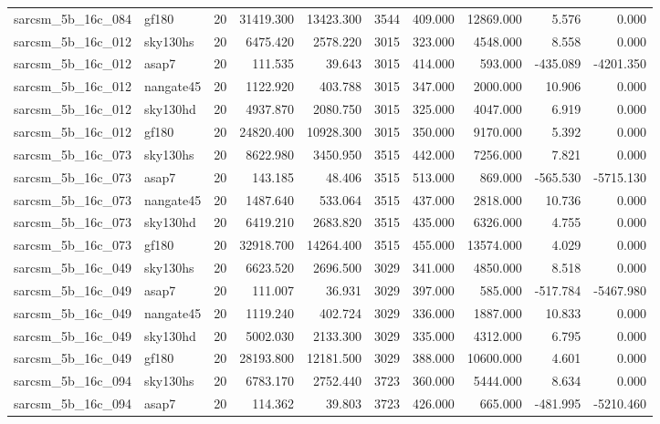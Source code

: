 \documentclass{article}
\begin{document}
\begin{longtable}{llrrrrrrrr}
sarcsm\_5b\_16c\_084 & gf180 & 20 & 31419.300 & 13423.300 & 3544 & 409.000 & 12869.000 & 5.576 & 0.000 \\
sarcsm\_5b\_16c\_012 & sky130hs & 20 & 6475.420 & 2578.220 & 3015 & 323.000 & 4548.000 & 8.558 & 0.000 \\
sarcsm\_5b\_16c\_012 & asap7 & 20 & 111.535 & 39.643 & 3015 & 414.000 & 593.000 & -435.089 & -4201.350 \\
sarcsm\_5b\_16c\_012 & nangate45 & 20 & 1122.920 & 403.788 & 3015 & 347.000 & 2000.000 & 10.906 & 0.000 \\
sarcsm\_5b\_16c\_012 & sky130hd & 20 & 4937.870 & 2080.750 & 3015 & 325.000 & 4047.000 & 6.919 & 0.000 \\
sarcsm\_5b\_16c\_012 & gf180 & 20 & 24820.400 & 10928.300 & 3015 & 350.000 & 9170.000 & 5.392 & 0.000 \\
sarcsm\_5b\_16c\_073 & sky130hs & 20 & 8622.980 & 3450.950 & 3515 & 442.000 & 7256.000 & 7.821 & 0.000 \\
sarcsm\_5b\_16c\_073 & asap7 & 20 & 143.185 & 48.406 & 3515 & 513.000 & 869.000 & -565.530 & -5715.130 \\
sarcsm\_5b\_16c\_073 & nangate45 & 20 & 1487.640 & 533.064 & 3515 & 437.000 & 2818.000 & 10.736 & 0.000 \\
sarcsm\_5b\_16c\_073 & sky130hd & 20 & 6419.210 & 2683.820 & 3515 & 435.000 & 6326.000 & 4.755 & 0.000 \\
sarcsm\_5b\_16c\_073 & gf180 & 20 & 32918.700 & 14264.400 & 3515 & 455.000 & 13574.000 & 4.029 & 0.000 \\
sarcsm\_5b\_16c\_049 & sky130hs & 20 & 6623.520 & 2696.500 & 3029 & 341.000 & 4850.000 & 8.518 & 0.000 \\
sarcsm\_5b\_16c\_049 & asap7 & 20 & 111.007 & 36.931 & 3029 & 397.000 & 585.000 & -517.784 & -5467.980 \\
sarcsm\_5b\_16c\_049 & nangate45 & 20 & 1119.240 & 402.724 & 3029 & 336.000 & 1887.000 & 10.833 & 0.000 \\
sarcsm\_5b\_16c\_049 & sky130hd & 20 & 5002.030 & 2133.300 & 3029 & 335.000 & 4312.000 & 6.795 & 0.000 \\
sarcsm\_5b\_16c\_049 & gf180 & 20 & 28193.800 & 12181.500 & 3029 & 388.000 & 10600.000 & 4.601 & 0.000 \\
sarcsm\_5b\_16c\_094 & sky130hs & 20 & 6783.170 & 2752.440 & 3723 & 360.000 & 5444.000 & 8.634 & 0.000 \\
sarcsm\_5b\_16c\_094 & asap7 & 20 & 114.362 & 39.803 & 3723 & 426.000 & 665.000 & -481.995 & -5210.460 \\

\end{longtable}
\end{document}
